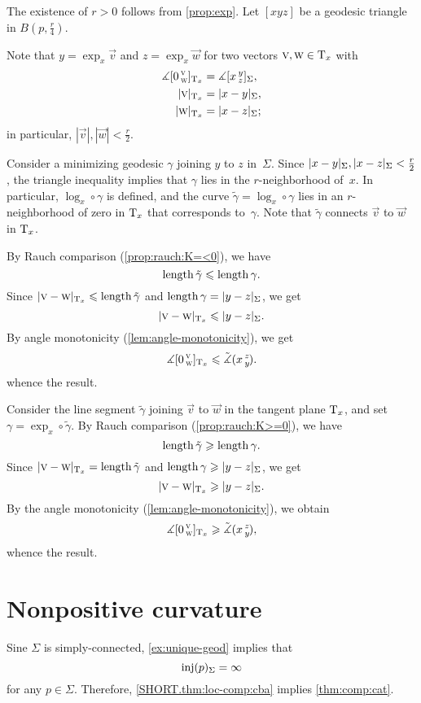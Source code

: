 The existence of $r>0$ follows from \ref{prop:exp}.
Let $[xyz]$ be a geodesic triangle in $B(p,\tfrac{r}4)$.

Note that $y=\exp_x\vec v$ and $z=\exp_x\vec w$ for two vectors $\text{\sc{v}},\text{\sc{w}}\in\mathrm{T}_x$ with
\begin{align*}
\measuredangle\hinge 0{\vec v}{\vec w}_{\T_x}&=\measuredangle\hinge xyz_\Sigma,
\\
|\vec v|_{\T_x}&=\dist{x}{y}\Sigma, 
\\
|\vec w|_{\T_x}&=\dist{x}{z}\Sigma;
\end{align*}
in particular, $|\vec v|, |\vec w|< \tfrac r2$.

Consider a minimizing geodesic $\gamma$ joining $y$ to $z$ in~$\Sigma$.
Since $\dist{x}{y}{\Sigma},\dist{x}{z}{\Sigma}\z<\tfrac r2$, the triangle inequality implies that $\gamma$ lies in the $r$-neighborhood of~$x$.
In particular, $\log_x\circ\gamma$ is defined, and the curve
$\tilde \gamma=\log_x\circ\gamma$ lies in an $r$-neighborhood of zero in $\mathrm{T}_x$ that corresponds to~$\gamma$.
Note that $\tilde\gamma$ connects $\vec v$ to $\vec w$ in $\mathrm{T}_x$.

By Rauch comparison (\ref{prop:rauch:K=<0}), we have
\[\mathop{\rm length}\nolimits \tilde \gamma\leqslant \mathop{\rm length}\nolimits\gamma.\]
Since $\dist{\vec v}{\vec w}{\T_x}\le\length\tilde \gamma$ and $\length\gamma=\dist{y}{z}{\Sigma}$, we get 
\[\dist{\vec v}{\vec w}{\T_x}\le \dist{y}{z}\Sigma.\]
By angle monotonicity (\ref{lem:angle-monotonicity}), we get
\[\measuredangle[0\,{}^{\text{\sc{v}}}_{\text{\sc{w}}}]_{\mathrm{T}_x}\leqslant \tilde\measuredangle(x\,{}^{z}_{y}\hspace{-0.2ex}).\]
whence the result.

Consider the line segment $\tilde \gamma$ joining $\vec v$ to $\vec w$ in the tangent plane $\mathrm{T}_x$, and set $\gamma=\exp_x\circ\tilde \gamma$.
By Rauch comparison (\ref{prop:rauch:K>=0}), we have
\[\mathop{\rm length}\nolimits \tilde \gamma\geqslant\mathop{\rm length}\nolimits\gamma.\]
Since $\dist{\vec v}{\vec w}{\T_x}=\length\tilde \gamma$ and $\length\gamma\ge\dist{y}{z}\Sigma$, we get 
\[\dist{\vec v}{\vec w}{\T_x}\ge \dist{y}{z}\Sigma.\]
By the angle monotonicity (\ref{lem:angle-monotonicity}), we obtain
\[\measuredangle[0\,{}^{\text{\sc{v}}}_{\text{\sc{w}}}]_{\mathrm{T}_x}\geqslant\tilde\measuredangle(x\,{}^{z}_{y}\hspace{-0.2ex}),\]
whence the result.
\qeds

\section{Nonpositive curvature}\label{sec:nonpos-comp}

Sine $\Sigma$ is simply-connected, \ref{ex:unique-geod} implies that 
\[\mathop{\rm inj}\nolimits(p)_\Sigma=\infty\]
for any $p\in\Sigma$.
Therefore, \ref{SHORT.thm:loc-comp:cba} implies \ref{thm:comp:cat}.
\qeds

